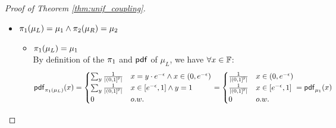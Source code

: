 \documentclass[a4paper,11pt]{article}
\begin{document}
\begin{proof}[Proof of Theorem \ref{thm:unif_coupling}]
\begin{itemize}
%
	\item $\pi_1(\mu_L) = \mu_1 \land \pi_2(\mu_R) = \mu_2$
	\begin{itemize}
		\item $\pi_1(\mu_L) = \mu_1$ 
		\\
%
		By definition of the $\pi_1$ and $\mathsf{pdf}$ of $\mu_L$, we have $\forall x  \in \mathbb{F}$:
		\[
			\mathsf{pdf}_{\pi_1(\mu_L)}(x) = 
			\begin{cases}
			\sum_{y}\frac{1}{\left \vert (0, 1]^{\mathbb{F}} \right \vert} 
			& x = y \cdot e^{-\epsilon}  \land x \in (0, e^{-\epsilon})\\
			\sum_{y} \frac{1}{\left \vert (0, 1]^{\mathbb{F}} \right \vert} 
			& x \in [e^{-\epsilon}, 1] \land y = 1\\
			0       & o.w.
			\end{cases} 
			= 
			\begin{cases}
			\frac{1}{\left \vert (0, 1]^{\mathbb{F}} \right \vert}
			&  x \in (0, e^{-\epsilon})\\
			\frac{1}{\left \vert (0, 1]^{\mathbb{F}} \right \vert}
			& x \in [e^{-\epsilon}, 1] \\
			0       & o.w.
			\end{cases}
			=
			\mathsf{pdf}_{\mu_1}(x)
		\]


\end{itemize}
\end{itemize}
\end{proof}
\end{document}
